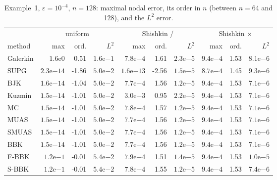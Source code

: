 \begin{table}[!htbp]
\centering\scriptsize\setlength{\tabcolsep}{3pt}
\caption{Example~1, $\varepsilon=10^{-4}$, $n=128$: maximal nodal error, its order in $n$ (between $n=64$ and 128), and the $L^2$ error.}\label{tab:acc-exp_layer-1e-04}
\begin{tabular}{l rrr rrr rrr}
\toprule
 & \multicolumn{3}{c}{uniform} & \multicolumn{3}{c}{Shishkin /} & \multicolumn{3}{c}{Shishkin $\times$}\\
method & max & ord. & $L^2$ & max & ord. & $L^2$ & max & ord. & $L^2$\\
\midrule
Galerkin & $1.6\mathrm{e}{0}$ & 0.51 & $1.6\mathrm{e}{-1}$ & $7.8\mathrm{e}{-4}$ & 1.61 & $2.3\mathrm{e}{-5}$ & $9.4\mathrm{e}{-4}$ & 1.53 & $8.1\mathrm{e}{-6}$ \\
SUPG & $2.3\mathrm{e}{-14}$ & -1.86 & $5.0\mathrm{e}{-2}$ & $1.6\mathrm{e}{-13}$ & -2.56 & $1.5\mathrm{e}{-5}$ & $8.7\mathrm{e}{-4}$ & 1.45 & $9.3\mathrm{e}{-6}$ \\
BJK & $1.6\mathrm{e}{-14}$ & -1.04 & $5.0\mathrm{e}{-2}$ & $7.7\mathrm{e}{-4}$ & 1.56 & $1.2\mathrm{e}{-5}$ & $9.4\mathrm{e}{-4}$ & 1.53 & $7.1\mathrm{e}{-6}$ \\
Kuzmin & $1.5\mathrm{e}{-14}$ & -1.01 & $5.0\mathrm{e}{-2}$ & $3.0\mathrm{e}{-3}$ & 0.95 & $2.2\mathrm{e}{-5}$ & $9.4\mathrm{e}{-4}$ & 1.53 & $7.1\mathrm{e}{-6}$ \\
MC & $1.5\mathrm{e}{-14}$ & -1.01 & $5.0\mathrm{e}{-2}$ & $7.8\mathrm{e}{-4}$ & 1.57 & $1.2\mathrm{e}{-5}$ & $9.4\mathrm{e}{-4}$ & 1.53 & $7.1\mathrm{e}{-6}$ \\
MUAS & $1.5\mathrm{e}{-14}$ & -1.01 & $5.0\mathrm{e}{-2}$ & $7.7\mathrm{e}{-4}$ & 1.56 & $1.2\mathrm{e}{-5}$ & $9.4\mathrm{e}{-4}$ & 1.53 & $7.1\mathrm{e}{-6}$ \\
SMUAS & $1.5\mathrm{e}{-14}$ & -1.01 & $5.0\mathrm{e}{-2}$ & $7.7\mathrm{e}{-4}$ & 1.56 & $1.2\mathrm{e}{-5}$ & $9.4\mathrm{e}{-4}$ & 1.53 & $7.1\mathrm{e}{-6}$ \\
BBK & $1.5\mathrm{e}{-14}$ & -1.01 & $5.0\mathrm{e}{-2}$ & $7.7\mathrm{e}{-4}$ & 1.56 & $1.2\mathrm{e}{-5}$ & $9.4\mathrm{e}{-4}$ & 1.53 & $7.1\mathrm{e}{-6}$ \\
F-BBK & $1.2\mathrm{e}{-1}$ & -0.01 & $5.4\mathrm{e}{-2}$ & $7.9\mathrm{e}{-4}$ & 1.51 & $1.4\mathrm{e}{-5}$ & $9.4\mathrm{e}{-4}$ & 1.53 & $1.0\mathrm{e}{-5}$ \\
S-BBK & $1.2\mathrm{e}{-1}$ & -0.01 & $5.4\mathrm{e}{-2}$ & $7.8\mathrm{e}{-4}$ & 1.55 & $1.2\mathrm{e}{-5}$ & $9.4\mathrm{e}{-4}$ & 1.53 & $7.4\mathrm{e}{-6}$ \\
\bottomrule
\end{tabular}
\end{table}

